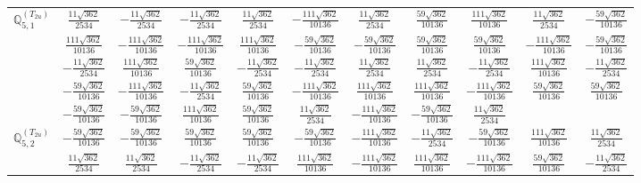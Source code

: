\documentclass[fleqn,10pt,landscape]{article}
\begin{document}
\begin{itemize}
{\begin{center}
\begin{longtable}{ccccccccccc}
$\mathbb{Q}_{5,1}^{(T_{2u})}$ & $ \frac{11 \sqrt{362}}{2534} $ & $ - \frac{11 \sqrt{362}}{2534} $ & $ - \frac{11 \sqrt{362}}{2534} $ & $ \frac{11 \sqrt{362}}{2534} $ & $ - \frac{111 \sqrt{362}}{10136} $ & $ \frac{11 \sqrt{362}}{2534} $ & $ \frac{59 \sqrt{362}}{10136} $ & $ \frac{111 \sqrt{362}}{10136} $ & $ \frac{11 \sqrt{362}}{2534} $ & $ - \frac{59 \sqrt{362}}{10136} $ \\
& $ \frac{111 \sqrt{362}}{10136} $ & $ - \frac{111 \sqrt{362}}{10136} $ & $ - \frac{111 \sqrt{362}}{10136} $ & $ \frac{111 \sqrt{362}}{10136} $ & $ - \frac{59 \sqrt{362}}{10136} $ & $ - \frac{59 \sqrt{362}}{10136} $ & $ \frac{59 \sqrt{362}}{10136} $ & $ \frac{59 \sqrt{362}}{10136} $ & $ - \frac{111 \sqrt{362}}{10136} $ & $ - \frac{59 \sqrt{362}}{10136} $ \\
& $ - \frac{11 \sqrt{362}}{2534} $ & $ \frac{111 \sqrt{362}}{10136} $ & $ \frac{59 \sqrt{362}}{10136} $ & $ - \frac{11 \sqrt{362}}{2534} $ & $ - \frac{11 \sqrt{362}}{2534} $ & $ \frac{11 \sqrt{362}}{2534} $ & $ \frac{11 \sqrt{362}}{2534} $ & $ - \frac{11 \sqrt{362}}{2534} $ & $ \frac{111 \sqrt{362}}{10136} $ & $ - \frac{11 \sqrt{362}}{2534} $ \\
& $ - \frac{59 \sqrt{362}}{10136} $ & $ - \frac{111 \sqrt{362}}{10136} $ & $ - \frac{11 \sqrt{362}}{2534} $ & $ \frac{59 \sqrt{362}}{10136} $ & $ - \frac{111 \sqrt{362}}{10136} $ & $ \frac{111 \sqrt{362}}{10136} $ & $ \frac{111 \sqrt{362}}{10136} $ & $ - \frac{111 \sqrt{362}}{10136} $ & $ \frac{59 \sqrt{362}}{10136} $ & $ \frac{59 \sqrt{362}}{10136} $ \\
& $ - \frac{59 \sqrt{362}}{10136} $ & $ - \frac{59 \sqrt{362}}{10136} $ & $ \frac{111 \sqrt{362}}{10136} $ & $ \frac{59 \sqrt{362}}{10136} $ & $ \frac{11 \sqrt{362}}{2534} $ & $ - \frac{111 \sqrt{362}}{10136} $ & $ - \frac{59 \sqrt{362}}{10136} $ & $ \frac{11 \sqrt{362}}{2534} $ & $  $ & $  $ \\ \hline
$\mathbb{Q}_{5,2}^{(T_{2u})}$ & $ - \frac{59 \sqrt{362}}{10136} $ & $ - \frac{59 \sqrt{362}}{10136} $ & $ \frac{59 \sqrt{362}}{10136} $ & $ \frac{59 \sqrt{362}}{10136} $ & $ - \frac{59 \sqrt{362}}{10136} $ & $ - \frac{111 \sqrt{362}}{10136} $ & $ - \frac{11 \sqrt{362}}{2534} $ & $ - \frac{59 \sqrt{362}}{10136} $ & $ \frac{111 \sqrt{362}}{10136} $ & $ \frac{11 \sqrt{362}}{2534} $ \\
& $ \frac{11 \sqrt{362}}{2534} $ & $ \frac{11 \sqrt{362}}{2534} $ & $ - \frac{11 \sqrt{362}}{2534} $ & $ - \frac{11 \sqrt{362}}{2534} $ & $ \frac{111 \sqrt{362}}{10136} $ & $ - \frac{111 \sqrt{362}}{10136} $ & $ \frac{111 \sqrt{362}}{10136} $ & $ - \frac{111 \sqrt{362}}{10136} $ & $ \frac{59 \sqrt{362}}{10136} $ & $ - \frac{11 \sqrt{362}}{2534} $ \\

\end{longtable}
\end{center}}
\end{itemize}
\end{document}
